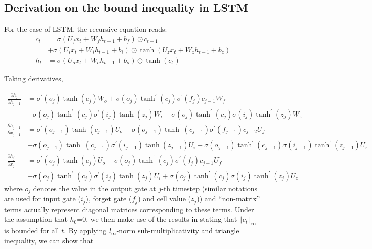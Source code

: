 \subsection{Derivation on the bound inequality in LSTM\label{subsec:Derivation-on-theLSTM}}

For the case of LSTM, the recursive equation reads:
\begin{align*}
c_{t} & =\sigma\left(U_{f}x_{t}+W_{f}h_{t-1}+b_{f}\right)\odot c_{t-1}\\
 & +\sigma\left(U_{i}x_{t}+W_{i}h_{t-1}+b_{i}\right)\odot\tanh\left(U_{z}x_{t}+W_{z}h_{t-1}+b_{z}\right)\\
h_{t} & =\sigma\left(U_{o}x_{t}+W_{o}h_{t-1}+b_{o}\right)\odot\tanh\left(c_{t}\right)
\end{align*}

Taking derivatives,

\begin{align*}
\frac{\partial h_{j}}{\partial h_{j-1}} & =\sigma^{\prime}\left(o_{j}\right)\tanh\left(c_{j}\right)W_{o}+\sigma\left(o_{j}\right)\tanh^{\prime}\left(c_{j}\right)\sigma^{\prime}\left(f_{j}\right)c_{j-1}W_{f}\\
 & +\sigma\left(o_{j}\right)\tanh^{\prime}\left(c_{j}\right)\sigma^{\prime}\left(i_{j}\right)\tanh\left(z_{j}\right)W_{i}+\sigma\left(o_{j}\right)\tanh^{\prime}\left(c_{j}\right)\sigma\left(i_{j}\right)\tanh^{\prime}\left(z_{j}\right)W_{z}\\
\frac{\partial h_{j-1}}{\partial x_{j-1}} & =\sigma^{\prime}\left(o_{j-1}\right)\tanh\left(c_{j-1}\right)U_{o}+\sigma\left(o_{j-1}\right)\tanh^{\prime}\left(c_{j-1}\right)\sigma^{\prime}\left(f_{j-1}\right)c_{j-2}U_{f}\\
 & +\sigma\left(o_{j-1}\right)\tanh^{\prime}\left(c_{j-1}\right)\sigma^{\prime}\left(i_{j-1}\right)\tanh\left(z_{j-1}\right)U_{i}+\sigma\left(o_{j-1}\right)\tanh^{\prime}\left(c_{j-1}\right)\sigma\left(i_{j-1}\right)\tanh^{\prime}\left(z_{j-1}\right)U_{z}\\
\frac{\partial h_{j}}{\partial x_{j}} & =\sigma^{\prime}\left(o_{j}\right)\tanh\left(c_{j}\right)U_{o}+\sigma\left(o_{j}\right)\tanh^{\prime}\left(c_{j}\right)\sigma^{\prime}\left(f_{j}\right)c_{j-1}U_{f}\\
 & +\sigma\left(o_{j}\right)\tanh^{\prime}\left(c_{j}\right)\sigma^{\prime}\left(i_{j}\right)\tanh\left(z_{j}\right)U_{i}+\sigma\left(o_{j}\right)\tanh^{\prime}\left(c_{j}\right)\sigma\left(i_{j}\right)\tanh^{\prime}\left(z_{j}\right)U_{z}
\end{align*}
where $o_{j}$ denotes the value in the output gate at $j$-th timestep
(similar notations are used for input gate ($i_{j}$), forget gate
($f_{j}$) and cell value ($z_{j}$)) and ``non-matrix'' terms actually
represent diagonal matrices corresponding to these terms. Under the
assumption that $h_{0}$=0, we then make use of the results in \cite{miller2018recurrent}
stating that $\left\Vert c_{t}\right\Vert _{\infty}$ is bounded for
all $t$. By applying $l_{\infty}$-norm sub-multiplicativity and
triangle inequality, we can show that

